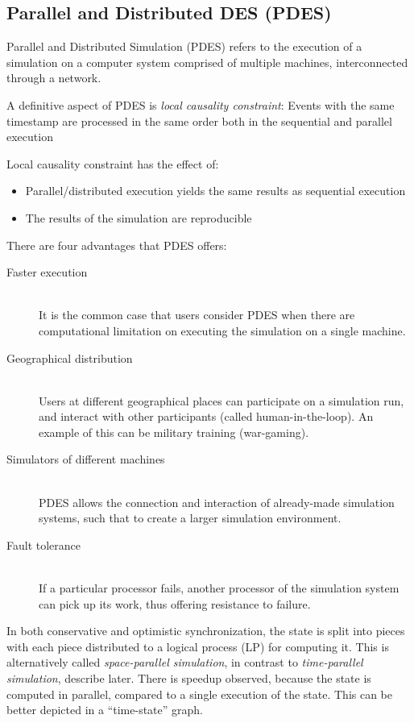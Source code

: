 \documentclass[a4paper]{article}
\begin{document}
\subsection{Parallel and Distributed DES (PDES)}

Parallel and Distributed Simulation (PDES) refers to the execution
of a simulation on a computer system comprised of multiple machines,
interconnected through a network.

A definitive aspect of PDES is \emph{local causality constraint}: Events with the same timestamp are processed in the same order both in the sequential and parallel execution

Local causality constraint has the effect of:

\begin{itemize}
\item  Parallel/distributed execution yields the same results as sequential execution
\item The results of the simulation are reproducible
\end{itemize}


There are four advantages that PDES offers:

\begin{description}
\item[Faster execution] \hfill \\
It is the common case that users consider PDES when there are computational limitation on
executing the simulation on a single machine.
\item[Geographical distribution] \hfill \\
Users at different geographical places can participate on a simulation run, and
interact with other participants (called human-in-the-loop). An example
of this can be military training (war-gaming).
\item[Simulators of different machines] \hfill \\
PDES allows the connection and interaction of already-made simulation systems, such
that to create a larger simulation environment.
\item[Fault tolerance] \hfill \\
If a particular processor fails, another processor of the simulation system can pick up
its work, thus offering resistance to failure.
\end{description}

In both conservative and optimistic synchronization, the state is split
into pieces with each piece distributed to a logical process (LP) for computing it.
This is alternatively called \emph{space-parallel simulation}, in contrast
to \emph{time-parallel simulation}, describe later.
There is speedup observed, because the state is computed in parallel, compared
to a single execution of the state. This can be better depicted in a ``time-state'' graph.
\end{document}
